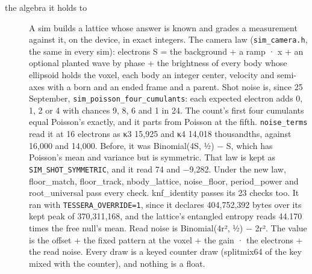 \begin{description}
\item[{the algebra it holds to}] A sim builds a lattice whose answer is known and grades a measurement against it, on the device, in exact integers. The camera law (\texttt{sim\_\allowbreak{}camera.\allowbreak{}h}, the same in every sim): electrons S = the background + a ramp · x + an optional planted wave by phase + the brightness of every body whose ellipsoid holds the voxel, each body an integer center, velocity and semi-axes with a born and an ended frame and a parent. Shot noise is, since 25 September, \texttt{sim\_\allowbreak{}poisson\_\allowbreak{}four\_\allowbreak{}cumulants}: each expected electron adds 0, 1, 2 or 4 with chances 9, 8, 6 and 1 in 24. The count's first four cumulants equal Poisson's exactly, and it parts from Poisson at the fifth. \texttt{noise\_\allowbreak{}terms} read it at 16 electrons as κ3 15,925 and κ4 14,018 thousandths, against 16,000 and 14,000. Before, it was Binomial(4S, ½) − S, which has Poisson's mean and variance but is symmetric. That law is kept as \texttt{SIM\_\allowbreak{}SHOT\_\allowbreak{}SYMMETRIC}, and it read 74 and −9,282. Under the new law, floor\_\allowbreak{}match, floor\_\allowbreak{}track, nbody\_\allowbreak{}lattice, noise\_\allowbreak{}floor, period\_\allowbreak{}power and root\_\allowbreak{}universal pass every check. knf\_\allowbreak{}identity passes its 23 checks too. It ran with \texttt{TESSERA\_\allowbreak{}OVERRIDE=1}, since it declares 404,752,392 bytes over its kept peak of 370,311,168, and the lattice's entangled entropy reads 44.170 times the free null's mean. Read noise is Binomial(4r², ½) − 2r². The value is the offset + the fixed pattern at the voxel + the gain · the electrons + the read noise. Every draw is a keyed counter draw (splitmix64 of the key mixed with the counter), and nothing is a float.

\end{description}
